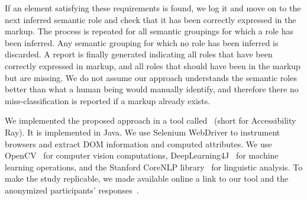 If an element satisfying these requirements is found, we log it and move on to the next inferred semantic role and check that it has been correctly expressed in the markup. The process is repeated for all semantic groupings for which a role has been inferred. Any semantic grouping for which no role has been inferred is discarded. A report is finally generated indicating all roles that have been correctly expressed in markup, and all roles that should have been 
in the markup but are missing. We do not assume our approach understands the semantic roles better than what a human being would manually identify, and therefore there no miss-classification is reported if a markup already exists.  

We implemented the proposed approach in a tool called~\toolname  
(short for Accessibility Ray). It is implemented in Java. 
We use Selenium WebDriver to instrument browsers and extract 
DOM information and computed attributes. We use OpenCV~\cite{opencv} 
for computer vision computations, DeepLearning4J~\cite{dl4j} for machine learning operations, and the Stanford CoreNLP library~\cite{stanfordCoreNLP} for linguistic analysis. 
To make the study replicable, we made available online a link to 
our \toolname tool and the anonymized participants' responses~\cite{tool-and-data}.